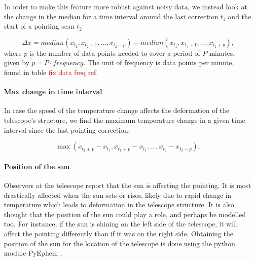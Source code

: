 In order to make this feature more robust against noisy data,
we instead look at the change in the median for a time interval around the last correction $t_1$ and the start of a pointing scan $t_2$

\begin{equation}
    \Delta x = \textit{median}(x_{t_2}, x_{t_2 - 1}, \dots, x_{t_2- p}) - \textit{median}(x_{t_1}, x_{t_1 + 1}, \dots, x_{t_1 + p}),
\end{equation}
where $p$ is the number of data points needed to cover a period of $P$ minutes, given by $p = P \cdot frequency$. The unit of frequency is data points per minute, found in table \textcolor{red}{fix data freq ref}.

\paragraph{Max change in time interval}
In case the speed of the temperature change affects the deformation of the telescope's structure, we find the maximum temperature change in a given time interval since the last pointing correction.

\begin{equation}
    \max (x_{t_1+p} - x_{t_1}, x_{t_1+p} - x_{t_1}, \dots, x_{t_2} - x_{t_2-p}),
\end{equation}


\paragraph{Position of the sun}
Observers at the telescope report that the sun is affecting the pointing.
It is most drastically affected when the sun sets or rises, likely due to rapid change in temperature which leads to deformation in the telescope structure.
It is also thought that the position of the sun could play a role, and perhaps be modelled too.
For instance, if the sun is shining on the left side of the telescope, it will affect the pointing differently than if it was on the right side.
Obtaining the position of the sun for the location of the telescope is done using the python module PyEphem \cite{ephem}.

